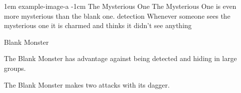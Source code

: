 \documentclass[letterpaper,openany,oneside,twocolumn]{book}
\begin{document}
\vfill\eject

\MonsterVariant%
	{1em}%
	{example-image-a}%
	{-1cm} %
	{The Mysterious One}%
	{%
		The Mysterious One is even more mysterious than the blank one.
		detection
		Whenever someone sees the mysterious one it is charmed and thinks it didn't see anything
	}%

\begin{DndMonster}[width=0.5\textwidth]{Blank Monster}

    \DndMonsterBasics[
        armor-class = {10},
        hit-points  = {\DndDice{1d12 + 6}},
        speed       = {30 ft., climb 25 ft.},
    ]

    \DndMonsterAbilityScores[
    ]

    \DndMonsterDetails[
        challenge = 1,
    ]
    
    The Blank Monster has advantage against being detected and hiding in large groups.
	
	The Blank Monster makes two attacks with its dagger.
	
	\DndMonsterAttack[
      name=Dagger,
      distance=melee, %
      mod=+3,
      reach=10,
      targets=one target,
      dmg=\DndDice{1d8 + 2},
      dmg-type=slashing,
    ]
      
\end{DndMonster}
\end{document}
